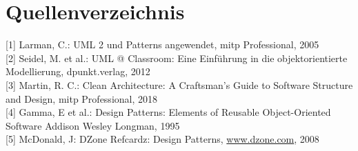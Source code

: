 \documentclass[10pt]{article}
\begin{document}
\section*{Quellenverzeichnis}
[1] Larman, C.: UML 2 und Patterns angewendet, mitp Professional, 2005\\[0pt]
[2] Seidel, M. et al.: UML @ Classroom: Eine Einführung in die objektorientierte Modellierung, dpunkt.verlag, 2012\\[0pt]
[3] Martin, R. C.: Clean Architecture: A Craftsman's Guide to Software Structure and Design, mitp Professional, 2018\\[0pt]
[4] Gamma, E et al.: Design Patterns: Elements of Reusable Object-Oriented Software Addison Wesley Longman, 1995\\[0pt]
[5] McDonald, J: DZone Refcardz: Design Patterns, \href{http://www.dzone.com}{www.dzone.com}, 2008
\end{document}
